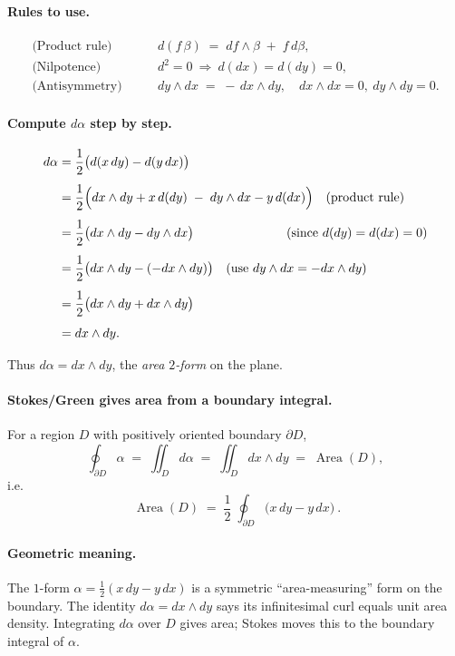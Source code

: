 \documentclass[11pt]{article}
\begin{document}
\paragraph{Rules to use.}
\begin{align*}
	\text{(Product rule)}\qquad & d(f\,\beta) \;=\; df\wedge \beta \;+\; f\,d\beta,\\[2pt]
	\text{(Nilpotence)}\qquad & d^2=0 \ \Rightarrow\ d(dx)=d(dy)=0,\\[2pt]
	\text{(Antisymmetry)}\qquad & dy\wedge dx \;=\; -\,dx\wedge dy,\quad dx\wedge dx=0,\ dy\wedge dy=0.
\end{align*}

\paragraph{Compute $d\alpha$ step by step.}
\begin{align*}
	d\alpha
	&= \frac12\bigl(d(x\,dy) - d(y\,dx)\bigr)\\[4pt]
	&= \frac12\Bigl( dx\wedge dy + x\,d(dy) \;-\; dy\wedge dx - y\,d(dx)\Bigr) \quad \text{(product rule)}\\[4pt]
	&= \frac12\bigl(dx\wedge dy - dy\wedge dx\bigr) \qquad\qquad\qquad\ \ \ \ \text{(since $d(dy)=d(dx)=0$)}\\[4pt]
	&= \frac12\bigl(dx\wedge dy - (-dx\wedge dy)\bigr) \quad \text{(use $dy\wedge dx=-dx\wedge dy$)}\\[4pt]
	&= \frac12\bigl(dx\wedge dy + dx\wedge dy\bigr)\\[4pt]
	&= dx\wedge dy.
\end{align*}

Thus $d\alpha = dx\wedge dy$, the \emph{area $2$-form} on the plane.

\paragraph{Stokes/Green gives area from a boundary integral.}
For a region $D$ with positively oriented boundary $\partial D$,
\[
\oint_{\partial D} \alpha
\;=\;
\iint_D d\alpha
\;=\;
\iint_D dx\wedge dy
\;=\;
\operatorname{Area}(D),
\]
i.e.
\[
\boxed{\ \operatorname{Area}(D)\;=\;\frac12\;\oint_{\partial D}\!\bigl(x\,dy - y\,dx\bigr)\ }.
\]

\paragraph{Geometric meaning.}
The $1$-form $\alpha=\tfrac12(x\,dy-y\,dx)$ is a symmetric “area-measuring” form on the boundary.
The identity $d\alpha=dx\wedge dy$ says its infinitesimal curl equals unit area density. Integrating
$d\alpha$ over $D$ gives area; Stokes moves this to the boundary integral of $\alpha$.
\end{document}
